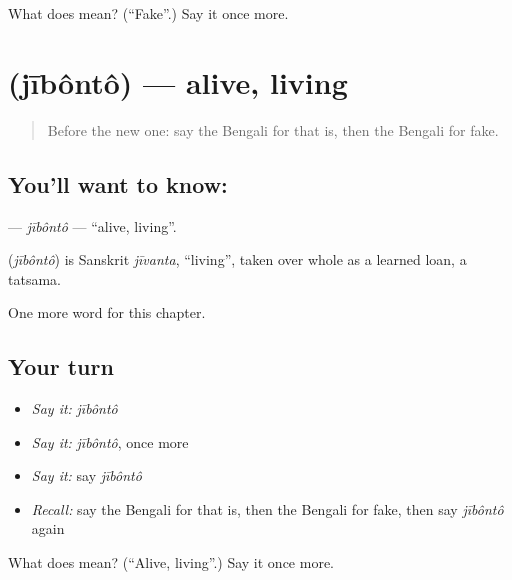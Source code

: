 \begin{tcolorbox}[breakable,colback=teal!4,colframe=teal!35!black,title={Before you move on}]
What does  mean? (\textquotedblleft{}Fake\textquotedblright{}.) Say it once more.
\end{tcolorbox}
\section[\texorpdfstring{\bn{জীবন্ত} (jībôntô)}{জীবন্ত (jībôntô)}]{ (jībôntô) — alive, living}

\label{lesson:BN-C219-jibonto}



\begin{quote}
Before the new one: say the Bengali for that is, then the Bengali for fake.
\end{quote}

\subsection*{You'll want to know: }
\textbf{} — \emph{jībôntô} — \textquotedblleft{}alive, living\textquotedblright{}.

\begin{cousinweb}
\textbf{} (\emph{jībôntô}) is Sanskrit \emph{jīvanta}, \textquotedblleft{}living\textquotedblright{}, taken over whole as a learned loan, a tatsama.
\end{cousinweb}

\begin{grammarlens}[title={What you've built}]
One more word for this chapter.
\end{grammarlens}

\subsection*{Your turn}
\begin{itemize}
\raggedright
  \item \emph{Say it:} \emph{jībôntô}
  \item \emph{Say it:} \emph{jībôntô}, once more
  \item \emph{Say it:} say \emph{jībôntô}
  \item \emph{Recall:} say the Bengali for that is, then the Bengali for fake, then say \emph{jībôntô} again
\end{itemize}

\begin{tcolorbox}[breakable,colback=teal!4,colframe=teal!35!black,title={Before you move on}]
What does  mean? (\textquotedblleft{}Alive, living\textquotedblright{}.) Say it once more.
\end{tcolorbox}
